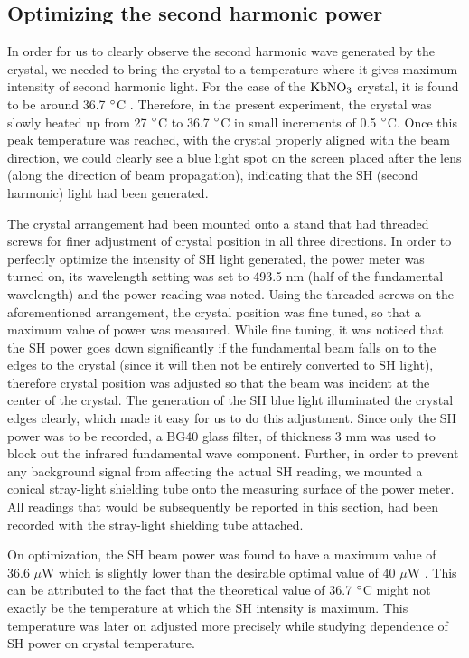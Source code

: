 \subsection{Optimizing the second harmonic power}
In order for us to clearly observe the second harmonic wave generated by the crystal, we needed to bring the crystal to a temperature where it gives maximum intensity of second harmonic light. For the case of the $\rm{KbNO_{3}}$ crystal, it is found to be around 36.7 $\degree$C \cite{UB}. Therefore, in the present experiment, the crystal was slowly heated up from 27 $\degree$C to 36.7 $\degree$C in small increments of 0.5 $\degree$C. Once this peak temperature was reached, with the crystal properly aligned with the beam direction, we could clearly see a blue light spot on the screen placed after the lens (along the direction of beam propagation), indicating that the SH (second harmonic) light had been generated. 

The crystal arrangement had been mounted onto a stand that had threaded screws for finer adjustment of crystal position in all three directions. In order to perfectly optimize the intensity of SH light generated, the power meter was turned on, its wavelength setting was set to 493.5 nm (half of the fundamental wavelength) and the power reading was noted. Using the threaded screws on the aforementioned arrangement, the crystal position was fine tuned, so that a maximum value of power was measured. While fine tuning, it was noticed that the SH power goes down significantly if the fundamental beam falls on to the edges to the crystal (since it will then not be entirely converted to SH light), therefore crystal position was adjusted so that the beam was incident at the center of the crystal. The generation of the SH blue light illuminated the crystal edges clearly, which made it easy for us to do this adjustment. Since only the SH power was to be recorded, a BG40 glass filter, of thickness 3 mm was used to block out the infrared fundamental wave component. Further, in order to prevent any background signal from affecting the actual SH reading, we mounted a conical stray-light shielding tube onto the measuring surface of the power meter. All readings that would be subsequently be reported in this section, had been recorded with the stray-light shielding tube attached. 

On optimization, the SH beam power was found to have a maximum value of 36.6 $\mu$W which is slightly lower than the desirable optimal value of 40 $\mu$W \cite{UB}. This can be attributed to the fact that the theoretical value of 36.7 $\degree$C might not exactly be the temperature at which the SH intensity is maximum. This temperature was later on adjusted more precisely while studying dependence of SH power on crystal temperature.

